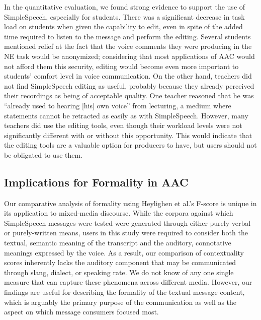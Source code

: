 In the quantitative evaluation, we found strong evidence to support the use of SimpleSpeech, especially for students.
There was a significant decrease in task load on students when given the capability to edit, even in spite of the added time required to listen to the message and perform the editing. 
Several students mentioned relief at the fact that the voice comments they were producing in the NE task would be anonymized; considering that most applications of AAC would not afford them this security, editing would become even more important to students' comfort level in voice communication.
On the other hand, teachers did not find SimpleSpeech editing as useful, probably because they already perceived their recordings as being of acceptable quality. 
One teacher reasoned that he was ``already used to hearing [his] own voice'' from lecturing, a medium where statements cannot be retracted as easily as with SimpleSpeech.
However, many teachers did use the editing tools, even though their workload levels were not significantly different with or without this opportunity.
This would indicate that the editing tools are a valuable option for producers to have, but users should not be obligated to use them.

\subsection{Implications for Formality in AAC}
Our comparative analysis of formality using Heylighen et al.'s F-score \cite{heylighen} is unique in its application to mixed-media discourse.
While the corpora against which SimpleSpeech messages were tested were generated through either purely-verbal or purely-written means, users in this study were required to consider both the textual, semantic meaning of the transcript and the auditory, connotative meanings expressed by the voice.
As a result, our comparison of contextuality scores inherently lacks the auditory component that may be communicated through slang, dialect, or speaking rate.
We do not know of any one single measure that can capture these phenomena across different media.
However, our findings are useful for describing the formality of the textual message content, which is arguably the primary purpose of the communication as well as the aspect on which message consumers focused most.

